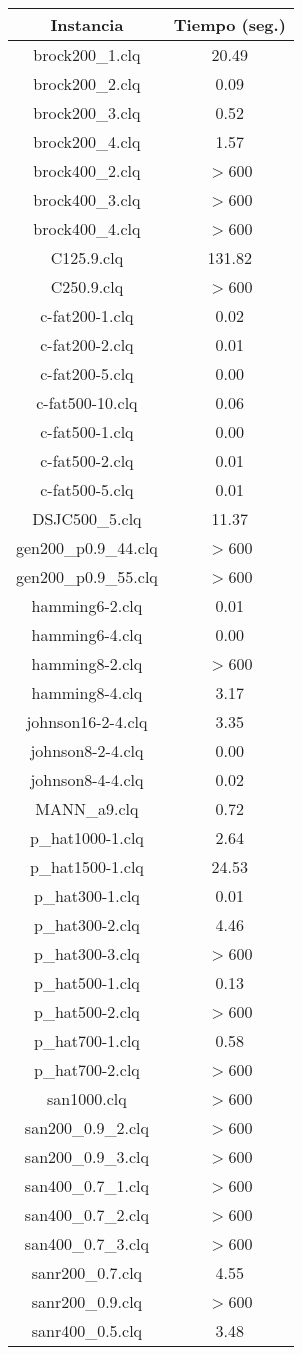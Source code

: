 \documentclass[10pt, a4paper]{article}
\begin{document}
\begin{center}
\begin{tabular}{ c c } 
Instancia & Tiempo (seg.) \\
\hline
brock200\_1.clq & 20.49 \\
brock200\_2.clq & 0.09 \\
brock200\_3.clq & 0.52 \\
brock200\_4.clq & 1.57 \\
brock400\_2.clq & $>$600 \\
brock400\_3.clq & $>$600 \\
brock400\_4.clq & $>$600 \\
C125.9.clq & 131.82 \\ 
C250.9.clq & $>$600 \\
c-fat200-1.clq & 0.02 \\
c-fat200-2.clq & 0.01 \\
c-fat200-5.clq & 0.00 \\
c-fat500-10.clq & 0.06 \\
c-fat500-1.clq & 0.00 \\
c-fat500-2.clq & 0.01 \\
c-fat500-5.clq & 0.01 \\
DSJC500\_5.clq & 11.37 \\
gen200\_p0.9\_44.clq & $>$600 \\
gen200\_p0.9\_55.clq & $>$600 \\
hamming6-2.clq & 0.01 \\
hamming6-4.clq & 0.00 \\
hamming8-2.clq & $>$600 \\
hamming8-4.clq & 3.17 \\
johnson16-2-4.clq & 3.35 \\
johnson8-2-4.clq & 0.00 \\
johnson8-4-4.clq & 0.02 \\
MANN\_a9.clq & 0.72 \\
p\_hat1000-1.clq & 2.64 \\
p\_hat1500-1.clq & 24.53 \\
p\_hat300-1.clq & 0.01 \\
p\_hat300-2.clq & 4.46 \\
p\_hat300-3.clq & $>$600 \\
p\_hat500-1.clq & 0.13 \\
p\_hat500-2.clq & $>$600 \\
p\_hat700-1.clq & 0.58 \\
p\_hat700-2.clq & $>$600 \\
san1000.clq & $>$600 \\
san200\_0.9\_2.clq & $>$600 \\
san200\_0.9\_3.clq & $>$600 \\
san400\_0.7\_1.clq & $>$600 \\
san400\_0.7\_2.clq & $>$600 \\
san400\_0.7\_3.clq & $>$600 \\
sanr200\_0.7.clq & 4.55 \\
sanr200\_0.9.clq & $>$600 \\
sanr400\_0.5.clq & 3.48 \\
\end{tabular}
\end{center}
\end{document}
